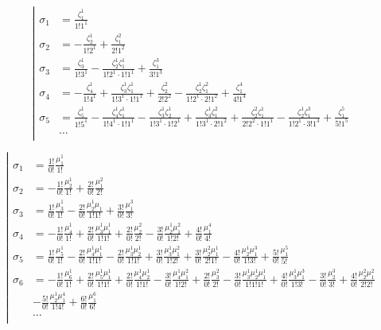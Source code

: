 \begin{equation*} \left| \begin{aligned} 
\sigma_1 &=
  \frac{\zeta_1^1}{1!1^1}
\\ 
\sigma_2 &=
- \frac{\zeta_2^1}{1!2^1} 
+ \frac{\zeta_1^2}{2!1^2}
\\
\sigma_3 &=
  \frac{\zeta_3^1}{1!3^1} 
- \frac{\zeta_2^1 \zeta_1^1}{1!2^1 \cdot 1!1^1} 
+ \frac{\zeta_1^3}{3!1^3}
\\
\sigma_4 &=
- \frac{\zeta_4^1}{1!4^1} 
+ \frac{\zeta_3^1 \zeta_1^1}{1!3^1 \cdot 1!1^1} 
+ \frac{\zeta_2^2}{2!2^2} 
- \frac{\zeta_2^1 \zeta_1^2}{1!2^1 \cdot 2!1^2} 
+ \frac{\zeta_1^4}{4!1^4}
\\
\sigma_5 &=
  \frac{\zeta_5^1}{1!5^1}
- \frac{\zeta_4^1 \zeta_1^1}{1!4^1 \cdot 1!1^1}
- \frac{\zeta_3^1 \zeta_2^1}{1!3^1 \cdot 1!2^1}
+ \frac{\zeta_3^1 \zeta_1^2}{1!3^1 \cdot 2!1^2}
+ \frac{\zeta_2^2 \zeta_1^1}{2!2^2 \cdot 1!1^1}
- \frac{\zeta_2^1 \zeta_1^3}{1!2^1 \cdot 3!1^3}
+ \frac{\zeta_1^5}{5!1^5}
\\
&\ldots
\\
\end{aligned} \right. \end{equation*}

\begin{equation*} \left| \begin{aligned}
\sigma_1 &= 
  \frac{1!}{0!} \frac{\mu_1^1}{1!}
\\ 
\sigma_2 &= 
- \frac{1!}{0!} \frac{\mu_2^1}{1!} 
+ \frac{2!}{0!} \frac{\mu_1^2}{2!}
\\
\sigma_3 &= 
  \frac{1!}{0!} \frac{\mu_3^1}{1!} 
- \frac{2!}{0!} \frac{\mu_2^1 \mu_1}{1!1!} 
+ \frac{3!}{0!} \frac{\mu_1^3}{3!}
\\
\sigma_4 &= 
- \frac{1!}{0!} \frac{\mu_4^1}{1!} 
+ \frac{2!}{0!} \frac{\mu_3^1 \mu_1^1}{1!1!} 
+ \frac{2!}{0!} \frac{\mu_2^2}{2!}
- \frac{3!}{0!} \frac{\mu_2^1 \mu_1^2}{1!2!}
+ \frac{4!}{0!} \frac{\mu_1^4}{4!}
\\
\sigma_5 &=
  \frac{1!}{0!} \frac{\mu_5^1}{1!} 
- \frac{2!}{0!} \frac{\mu_4^1 \mu_1^1}{1!1!} 
- \frac{2!}{0!} \frac{\mu_3^1 \mu_2^1}{1!1!}
+ \frac{3!}{0!} \frac{\mu_3^1 \mu_1^2}{1!2!}
+ \frac{3!}{0!} \frac{\mu_2^2 \mu_1^1}{2!1!}
- \frac{4!}{0!} \frac{\mu_2^1 \mu_1^3}{1!3!}
+ \frac{5!}{0!} \frac{\mu_1^5}{5!}
\\
\sigma_6 &=
- \frac{1!}{0!} \frac{\mu_6^1}{1!} 
+ \frac{2!}{0!} \frac{\mu_5^1 \mu_1^1}{1!1!} 
+ \frac{2!}{0!} \frac{\mu_4^1 \mu_2^1}{1!1!}
- \frac{3!}{0!} \frac{\mu_4^1 \mu_1^2}{1!2!}
+ \frac{2!}{0!} \frac{\mu_3^2}{2!}
- \frac{3!}{0!} \frac{\mu_3^1 \mu_2^1 \mu_1^1}{1!1!1!}
+ \frac{4!}{0!} \frac{\mu_3^1 \mu_1^3}{1!3!}
- \frac{3!}{0!} \frac{\mu_2^3}{3!}
+ \frac{4!}{0!} \frac{\mu_2^2 \mu_1^2}{2!2!} \\
&
- \frac{5!}{0!} \frac{\mu_2^1 \mu_1^4}{1!4!}
+ \frac{6!}{0!} \frac{\mu_1^6}{6!}
\\
&\ldots
\\
\end{aligned} \right. \end{equation*}


